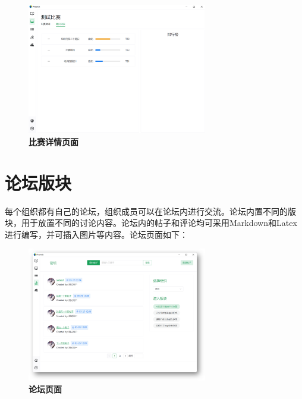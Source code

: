 \begin{figure}[H]
    \centering
    \includegraphics[width=0.7\textwidth]{figure/contest2.png}
    \caption{\textbf{比赛详情页面}}
    \label{fig:contest2}
\end{figure}

\section{论坛版块}

每个组织都有自己的论坛，组织成员可以在论坛内进行交流。论坛内置不同的版块，用于放置不同的讨论内容。论坛内的帖子和评论均可采用Markdown和Latex进行编写，并可插入图片等内容。论坛页面如下：

\begin{figure}[H]
    \centering
    \includegraphics[width=0.7\textwidth]{figure/forum1.png}
    \caption{\textbf{论坛页面}}
    \label{fig:forum1}
\end{figure}
